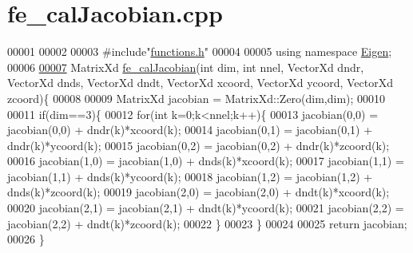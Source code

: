 \hypertarget{fe__cal_jacobian_8cpp_source}{}\section{fe\+\_\+cal\+Jacobian.\+cpp}
\label{fe__cal_jacobian_8cpp_source}

\begin{DoxyCode}
00001 
00002 
00003 \textcolor{preprocessor}{#include"\hyperlink{functions_8h}{functions.h}"}
00004 
00005 \textcolor{keyword}{using namespace }\hyperlink{namespace_eigen}{Eigen};
00006 
\hyperlink{fe__cal_jacobian_8cpp_a5ae3771e65b4a0d177097041a4349c28}{00007} MatrixXd \hyperlink{fe__cal_jacobian_8cpp_a5ae3771e65b4a0d177097041a4349c28}{fe\_calJacobian}(\textcolor{keywordtype}{int} dim, \textcolor{keywordtype}{int} nnel, VectorXd dndr, VectorXd dnds, VectorXd dndt, 
      VectorXd xcoord, VectorXd ycoord, VectorXd zcoord)\{
00008     
00009     MatrixXd jacobian = MatrixXd::Zero(dim,dim);
00010 
00011     \textcolor{keywordflow}{if}(dim==3)\{
00012         \textcolor{keywordflow}{for}(\textcolor{keywordtype}{int} k=0;k<nnel;k++)\{
00013             jacobian(0,0) = jacobian(0,0) + dndr(k)*xcoord(k);
00014             jacobian(0,1) = jacobian(0,1) + dndr(k)*ycoord(k);
00015             jacobian(0,2) = jacobian(0,2) + dndr(k)*zcoord(k);
00016             jacobian(1,0) = jacobian(1,0) + dnds(k)*xcoord(k);
00017             jacobian(1,1) = jacobian(1,1) + dnds(k)*ycoord(k);
00018             jacobian(1,2) = jacobian(1,2) + dnds(k)*zcoord(k);
00019             jacobian(2,0) = jacobian(2,0) + dndt(k)*xcoord(k);
00020             jacobian(2,1) = jacobian(2,1) + dndt(k)*ycoord(k);
00021             jacobian(2,2) = jacobian(2,2) + dndt(k)*zcoord(k);
00022         \}           
00023     \}
00024 
00025     \textcolor{keywordflow}{return} jacobian;
00026 \}
\end{DoxyCode}
